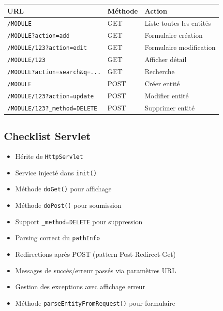 \documentclass[12pt,a4paper]{article}
\begin{document}
\begin{center}
\begin{tabular}{|l|l|l|}
\hline
\textbf{URL} & \textbf{Méthode} & \textbf{Action} \\
\hline
\texttt{/MODULE} & GET & Liste toutes les entités \\
\hline
\texttt{/MODULE?action=add} & GET & Formulaire création \\
\hline
\texttt{/MODULE/123?action=edit} & GET & Formulaire modification \\
\hline
\texttt{/MODULE/123} & GET & Afficher détail \\
\hline
\texttt{/MODULE?action=search\&q=...} & GET & Recherche \\
\hline
\texttt{/MODULE} & POST & Créer entité \\
\hline
\texttt{/MODULE/123?action=update} & POST & Modifier entité \\
\hline
\texttt{/MODULE/123?\_method=DELETE} & POST & Supprimer entité \\
\hline
\end{tabular}
\end{center}

\subsection{Checklist Servlet}

\begin{itemize}
    \item[$\square$] Hérite de \texttt{HttpServlet}
    \item[$\square$] Service injecté dans \texttt{init()}
    \item[$\square$] Méthode \texttt{doGet()} pour affichage
    \item[$\square$] Méthode \texttt{doPost()} pour soumission
    \item[$\square$] Support \texttt{\_method=DELETE} pour suppression
    \item[$\square$] Parsing correct du \texttt{pathInfo}
    \item[$\square$] Redirections après POST (pattern Post-Redirect-Get)
    \item[$\square$] Messages de succès/erreur passés via paramètres URL
    \item[$\square$] Gestion des exceptions avec affichage erreur
    \item[$\square$] Méthode \texttt{parseEntityFromRequest()} pour formulaire
\end{itemize}
\end{document}
